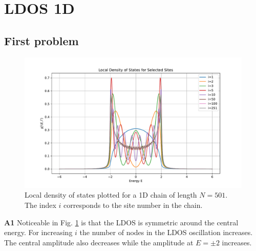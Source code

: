 \section{LDOS 1D}

\subsection{First problem}

\begin{figure}[H]
    \centering    \includegraphics[width=\textwidth]{Figures/task1.pdf}
    \caption{Local density of states plotted for a 1D chain of length $N=501$. The index $i$ corresponds to the site number in the chain.}
    \label{fig:task1}
\end{figure}
\textbf{A1} Noticeable in Fig. \ref{fig:task1} is that the LDOS is symmetric around the central energy. For increasing $i$ the number of nodes in the LDOS oscillation increases. The central amplitude also decreases while the amplitude at $E = \pm 2$ increases.